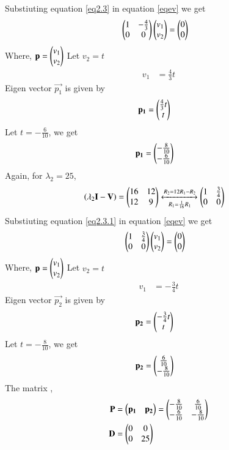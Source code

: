 \documentclass[journal,12pt,twocolumn]{IEEEtran}
\begin{document}
Substiuting equation \ref{eq2.3} in equation \ref{eqev} we get
\begin{align}
&\begin{pmatrix}1&-\frac{4}{3}\\0&0\end{pmatrix}\begin{pmatrix}v_1 \\ v_2\end{pmatrix}=\begin{pmatrix}0 \\ 0\end{pmatrix}\label{eqei1}
\end{align}
Where, $\mathbf{p}=\begin{pmatrix}v_1\\v_2\end{pmatrix}$
Let $v_2=t$
\begin{align}
    v_1&=\frac{4}{3}t
\end{align}
Eigen vector $\vec{p_1}$ is given by
\begin{align}
    \mathbf{p_1}&=\begin{pmatrix}\frac{4}{3}t \\ t\end{pmatrix}
\end{align}
Let $t=-\frac{6}{10}$, we get
\begin{align}
        \mathbf{p_1}&=\begin{pmatrix}-\frac{8}{10} \\-\frac{6}{10} \end{pmatrix}\label{eqp1}
\end{align}
Again, for $\lambda_2=25$,
\begin{align}
\left(\lambda_2\mathbf{I}-\mathbf{V}\right)&=\begin{pmatrix}16&12\\12&9\end{pmatrix}\xleftrightarrow[R_1=\frac{1}{16}R_1]{R_2=12R_1-R_2}\begin{pmatrix}1&\frac{3}{4}\\0&0\end{pmatrix} \label{eq2.3.1}
\end{align}
Substiuting equation \ref{eq2.3.1} in equation \ref{eqev} we get
\begin{align}
&\begin{pmatrix}1&\frac{3}{4}\\0&0\end{pmatrix}\begin{pmatrix}v_1 \\ v_2\end{pmatrix}=\begin{pmatrix}0 \\ 0\end{pmatrix}\label{eqei1}
\end{align}
Where, $\mathbf{p}=\begin{pmatrix}v_1\\v_2\end{pmatrix}$
Let $v_2=t$
\begin{align}
    v_1&=-\frac{3}{4}t
\end{align}
Eigen vector $\vec{p_2}$ is given by
\begin{align}
    \mathbf{p_2}&=\begin{pmatrix}-\frac{3}{4}t \\ t\end{pmatrix}
\end{align}
Let $t=-\frac{8}{10}$, we get
\begin{align}
        \mathbf{p_2}&=\begin{pmatrix}\frac{6}{10} \\-\frac{8}{10} \end{pmatrix}\label{eqp1}
\end{align}
The matrix ,
\begin{align}
\mathbf{P}&=\begin{pmatrix}\mathbf{p_1}&\mathbf{p_2}\end{pmatrix}=\begin{pmatrix}-\frac{8}{10}&\frac{6}{10}\\-\frac{6}{10}&-\frac{8}{10}\end{pmatrix} \\
\mathbf{D}&=\begin{pmatrix}0&0\\0&25\end{pmatrix}
\end{align}
\end{document}
